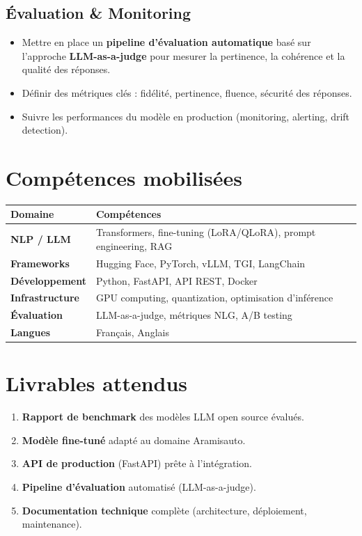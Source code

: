 \documentclass[12pt,a4paper]{article}
\begin{document}
\subsection{Évaluation \& Monitoring}

\begin{itemize}[leftmargin=1.5em, itemsep=4pt]
    \item Mettre en place un \textbf{pipeline d'évaluation automatique} basé sur l'approche \textbf{LLM-as-a-judge} pour mesurer la pertinence, la cohérence et la qualité des réponses.
    \item Définir des métriques clés : fidélité, pertinence, fluence, sécurité des réponses.
    \item Suivre les performances du modèle en production (monitoring, alerting, drift detection).
\end{itemize}

\section{Compétences mobilisées}

\begin{tabularx}{\textwidth}{>{\bfseries\color{aramisbleu}}l X}
    \toprule
    Domaine & Compétences \\
    \midrule
    NLP / LLM & Transformers, fine-tuning (LoRA/QLoRA), prompt engineering, RAG \\
    Frameworks & Hugging Face, PyTorch, vLLM, TGI, LangChain \\
    Développement & Python, FastAPI, API REST, Docker \\
    Infrastructure & GPU computing, quantization, optimisation d'inférence \\
    Évaluation & LLM-as-a-judge, métriques NLG, A/B testing \\
    Langues & Français, Anglais \\
    \bottomrule
\end{tabularx}

\section{Livrables attendus}

\begin{enumerate}[leftmargin=1.5em, itemsep=4pt]
    \item \textbf{Rapport de benchmark} des modèles LLM open source évalués.
    \item \textbf{Modèle fine-tuné} adapté au domaine Aramisauto.
    \item \textbf{API de production} (FastAPI) prête à l'intégration.
    \item \textbf{Pipeline d'évaluation} automatisé (LLM-as-a-judge).
    \item \textbf{Documentation technique} complète (architecture, déploiement, maintenance).
\end{enumerate}
\end{document}
